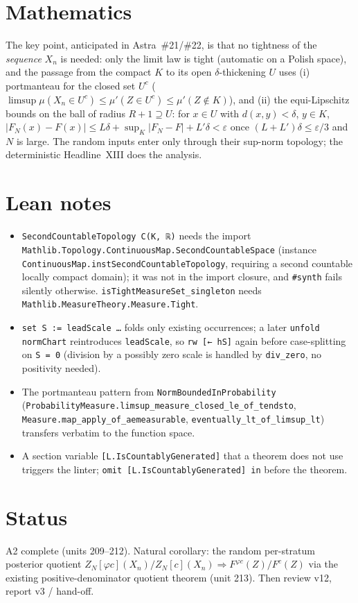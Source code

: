 \documentclass[11pt]{article}
\begin{document}
\section{Mathematics}
The key point, anticipated in Astra~\#21/\#22, is that no tightness of the \emph{sequence} $X_n$ is
needed: only the limit law is tight (automatic on a Polish space), and the passage from the compact
$K$ to its open $\delta$-thickening $U$ uses (i) portmanteau for the closed set $U^c$
($\limsup\mu(X_n\in U^c)\le\mu'(Z\in U^c)\le\mu'(Z\notin K)$), and (ii) the equi-Lipschitz bounds on
the ball of radius $R+1\supseteq U$: for $x\in U$ with $d(x,y)<\delta$, $y\in K$,
$|F_N(x)-F(x)|\le L\delta+\sup_K|F_N-F|+L'\delta<\varepsilon$ once $(L+L')\delta\le\varepsilon/3$ and
$N$ is large. The random inputs enter only through their sup-norm topology; the deterministic
Headline~XIII does the analysis.

\section{Lean notes}
\begin{itemize}
\item \texttt{SecondCountableTopology C(K, ℝ)} needs the import
  \texttt{Mathlib.Topology.ContinuousMap.\allowbreak SecondCountableSpace} (instance
  \texttt{ContinuousMap.instSecondCountableTopology}, requiring a second countable locally compact
  domain); it was not in the import closure, and \texttt{\#synth} fails silently otherwise.
  \texttt{isTightMeasureSet\_singleton} needs \texttt{Mathlib.MeasureTheory.Measure.Tight}.
\item \texttt{set S := leadScale …} folds only existing occurrences; a later \texttt{unfold normChart}
  reintroduces \texttt{leadScale}, so \texttt{rw [← hS]} again before case-splitting on \texttt{S = 0}
  (division by a possibly zero scale is handled by \texttt{div\_zero}, no positivity needed).
\item The portmanteau pattern from \texttt{NormBoundedInProbability}
  (\texttt{ProbabilityMeasure.limsup\_measure\_closed\_le\_of\_tendsto}, \texttt{Measure.map\_apply\_of\_aemeasurable},
  \texttt{eventually\_lt\_of\_limsup\_lt}) transfers verbatim to the function space.
\item A section variable \texttt{[L.IsCountablyGenerated]} that a theorem does not use triggers the
  linter; \texttt{omit [L.IsCountablyGenerated] in} before the theorem.
\end{itemize}

\section{Status}
A2 complete (units 209--212). Natural corollary: the random per-stratum posterior quotient
$Z_N[\varphi c](X_n)/Z_N[c](X_n)\Rightarrow F^{\varphi c}(Z)/F^{c}(Z)$ via the existing
positive-denominator quotient theorem (unit 213). Then review v12, report v3 / hand-off.
\end{document}
